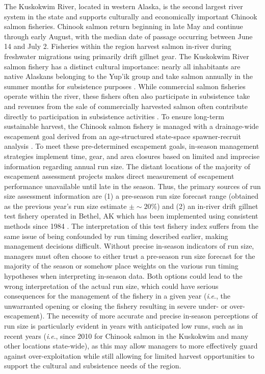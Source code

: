 \documentclass[12pt,]{book}
\theoremstyle{definition}
\theoremstyle{definition}
\theoremstyle{definition}
\theoremstyle{remark}
\begin{document}
The Kuskokwim River, located in western Alaska, is the second largest
river system in the state and supports culturally and economically
important Chinook salmon fisheries. Chinook salmon return beginning in
late May and continue through early August, with the median date of
passage occurring between June 14 and July 2. Fisheries within the
region harvest salmon in-river during freshwater migrations using
primarily drift gillnet gear. The Kuskokwim River salmon fishery has a
distinct cultural importance: nearly all inhabitants are native Alaskans
belonging to the Yup'ik group and take salmon annually in the summer
months for subsistence purposes \citep{linderman-bergstrom-2009}. While
commercial salmon fisheries operate within the river, these fishers
often also participate in subsistence take and revenues from the sale of
commercially harvested salmon often contribute directly to participation
in subsistence activities \citep{wolfe-spaeder-2009}. To ensure
long-term sustainable harvest, the Chinook salmon fishery is managed
with a drainage-wide escapement goal derived from an age-structured
state-space spawner-recruit analysis
\citep{hamazaki-etal-2012, staton-etal-2017-intseq}. To meet these
pre-determined escapement goals, in-season management strategies
implement time, gear, and area closures based on limited and imprecise
information regarding annual run size. The distant locations of the
majority of escapement assessment projects makes direct measurement of
escapement performance unavailable until late in the season. Thus, the
primary sources of run size assessment information are (1) a pre-season
run size forecast range (obtained as the previous year's run size
estimate \(\pm \sim 20\%\)) and (2) an in-river drift gillnet test
fishery operated in Bethel, AK which has been implemented using
consistent methods since 1984 \citep[described in][]{bue-lipka-2016}.
The interpretation of this test fishery index suffers from the same
issue of being confounded by run timing described earlier, making
management decisions difficult. Without precise in-season indicators of
run size, managers must often choose to either trust a pre-season run
size forecast for the majority of the season or somehow place weights on
the various run timing hypotheses when interpreting in-season data. Both
options could lead to the wrong interpretation of the actual run size,
which could have serious consequences for the management of the fishery
in a given year (\emph{i}.\emph{e}., the unwarranted opening or closing
the fishery resulting in severe under- or over-escapement). The
necessity of more accurate and precise in-season perceptions of run size
is particularly evident in years with anticipated low runs, such as in
recent years (\emph{i}.\emph{e}., since 2010 for Chinook salmon in the
Kuskokwim and many other locations state-wide), as this may allow
managers to more effectively guard against over-exploitation while still
allowing for limited harvest opportunities to support the cultural and
subsistence needs of the region.
\end{document}
